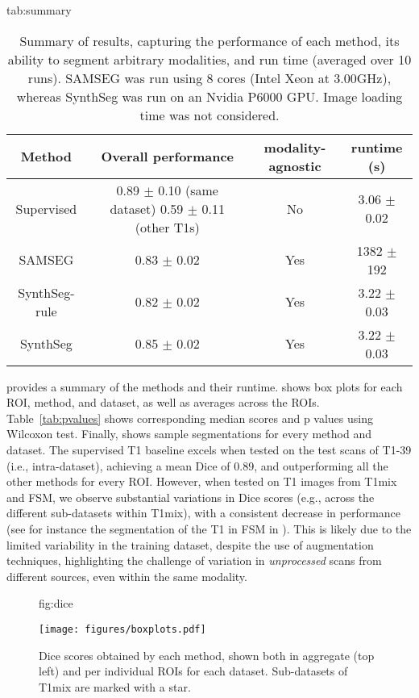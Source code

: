 \documentclass{midl}
\newcommand{\netname}{SynthSeg}
\begin{document}
\begin{table}[tbp]
\setlength\tabcolsep{3pt} 
\floatconts
  {tab:summary}
  {\caption{Summary of results, capturing the performance of each method, its ability to segment arbitrary modalities, and run time (averaged over 10 runs). SAMSEG was run using 8 cores (Intel Xeon at 3.00GHz), whereas \netname{} was run on an Nvidia P6000 GPU. Image loading time was not considered.}}
  {\small \begin{tabular}{c || c |  c |  c}
  \hline
  Method & Overall performance & modality-agnostic & runtime (s)  \\
  \hline \hline
 Supervised & 0.89 $\pm$ 0.10 (same dataset) 0.59 $\pm$ 0.11 (other T1s) & No & 3.06 $\pm$ 0.02\\  
 SAMSEG & 0.83 $\pm$ 0.02  & Yes & 1382 $\pm$ 192\\  
 \netname{}-rule & 0.82 $\pm$ 0.02 & Yes & 3.22 $\pm$ 0.03\\  
 \netname{} & 0.85 $\pm$ 0.02 & Yes & 3.22 $\pm$ 0.03\\  
  \hline
  \end{tabular}}
\end{table}

 provides a summary of the methods and their runtime.  shows box plots for each ROI, method, and dataset, as well as averages across the ROIs. Table~\ref{tab:pvalues} shows corresponding median scores and p values using Wilcoxon test. Finally,   shows sample segmentations for every method and dataset. The supervised T1 baseline excels when tested on the test scans of T1-39 (i.e., intra-dataset), achieving a mean Dice of 0.89, and outperforming all the other methods for every ROI. However, when tested on T1 images from T1mix and FSM, we observe substantial variations in Dice scores (e.g., across the different sub-datasets within T1mix), with a consistent decrease in performance (see for instance the segmentation of the T1 in FSM in ). This is likely due to the limited variability in the training dataset, despite the use of augmentation techniques, highlighting the challenge of variation in \textit{unprocessed} scans from different sources, even within the same modality.

\begin{figure}[t]
\floatconts
  {fig:dice}
  {\caption{Dice scores obtained by each method, shown both in aggregate (top left) and per individual ROIs for each dataset. Sub-datasets of T1mix are marked with a star.}}
  {\texttt{[image: figures/boxplots.pdf]}}
\end{figure}
\end{document}
